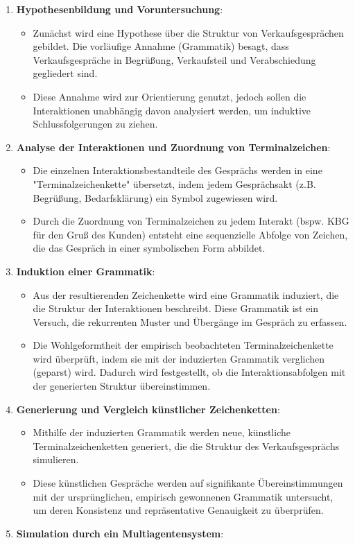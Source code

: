 \documentclass[
]{article}
\begin{document}
\begin{enumerate}
\def\labelenumi{\arabic{enumi}.}
\item
  \textbf{Hypothesenbildung und Voruntersuchung}:

  \begin{itemize}
  \item
    Zunächst wird eine Hypothese über die Struktur von Verkaufsgesprächen gebildet. Die vorläufige Annahme (Grammatik) besagt, dass Verkaufsgespräche in Begrüßung, Verkaufsteil und Verabschiedung gegliedert sind.
  \item
    Diese Annahme wird zur Orientierung genutzt, jedoch sollen die Interaktionen unabhängig davon analysiert werden, um induktive Schlussfolgerungen zu ziehen.
  \end{itemize}
\item
  \textbf{Analyse der Interaktionen und Zuordnung von Terminalzeichen}:

  \begin{itemize}
  \item
    Die einzelnen Interaktionsbestandteile des Gesprächs werden in eine "Terminalzeichenkette" übersetzt, indem jedem Gesprächsakt (z.B. Begrüßung, Bedarfsklärung) ein Symbol zugewiesen wird.
  \item
    Durch die Zuordnung von Terminalzeichen zu jedem Interakt (bspw. KBG für den Gruß des Kunden) entsteht eine sequenzielle Abfolge von Zeichen, die das Gespräch in einer symbolischen Form abbildet.
  \end{itemize}
\item
  \textbf{Induktion einer Grammatik}:

  \begin{itemize}
  \item
    Aus der resultierenden Zeichenkette wird eine Grammatik induziert, die die Struktur der Interaktionen beschreibt. Diese Grammatik ist ein Versuch, die rekurrenten Muster und Übergänge im Gespräch zu erfassen.
  \item
    Die Wohlgeformtheit der empirisch beobachteten Terminalzeichenkette wird überprüft, indem sie mit der induzierten Grammatik verglichen (geparst) wird. Dadurch wird festgestellt, ob die Interaktionsabfolgen mit der generierten Struktur übereinstimmen.
  \end{itemize}
\item
  \textbf{Generierung und Vergleich künstlicher Zeichenketten}:

  \begin{itemize}
  \item
    Mithilfe der induzierten Grammatik werden neue, künstliche Terminalzeichenketten generiert, die die Struktur des Verkaufsgesprächs simulieren.
  \item
    Diese künstlichen Gespräche werden auf signifikante Übereinstimmungen mit der ursprünglichen, empirisch gewonnenen Grammatik untersucht, um deren Konsistenz und repräsentative Genauigkeit zu überprüfen.
  \end{itemize}
\item
  \textbf{Simulation durch ein Multiagentensystem}:


\end{enumerate}
\end{document}
